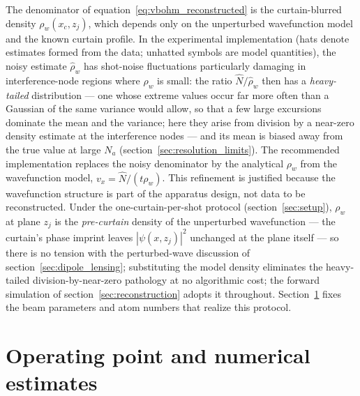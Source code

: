 \documentclass[11pt,a4paper]{article}
\begin{document}
The denominator of equation~\eqref{eq:vbohm_reconstructed} is the curtain-blurred density $\rho_w(x_c, z_j)$, which depends only on the unperturbed wavefunction model and the known curtain profile. In the experimental implementation (hats denote estimates formed from the data; unhatted symbols are model quantities), the noisy estimate $\widehat\rho_w$ has shot-noise fluctuations particularly damaging in interference-node regions where $\rho_w$ is small: the ratio $\widehat{N}/\widehat\rho_w$ then has a \emph{heavy-tailed} distribution --- one whose extreme values occur far more often than a Gaussian of the same variance would allow, so that a few large excursions dominate the mean and the variance; here they arise from division by a near-zero density estimate at the interference nodes --- and its mean is biased away from the true value at large $N_a$ (section~\ref{sec:resolution_limits}). The recommended implementation replaces the noisy denominator by the analytical $\rho_w$ from the wavefunction model, $v_x = \widehat{N}/(t\rho_w)$. This refinement is justified because the wavefunction structure is part of the apparatus design, not data to be reconstructed. Under the one-curtain-per-shot protocol (section~\ref{sec:setup}), $\rho_w$ at plane $z_j$ is the \emph{pre-curtain} density of the unperturbed wavefunction --- the curtain's phase imprint leaves $|\psi(x, z_j)|^2$ unchanged at the plane itself --- so there is no tension with the perturbed-wave discussion of section~\ref{sec:dipole_lensing}; substituting the model density eliminates the heavy-tailed division-by-near-zero pathology at no algorithmic cost; the forward simulation of section~\ref{sec:reconstruction} adopts it throughout. Section~\ref{sec:numerics} fixes the beam parameters and atom numbers that realize this protocol.

\section{Operating point and numerical estimates}
\label{sec:numerics}
\end{document}
